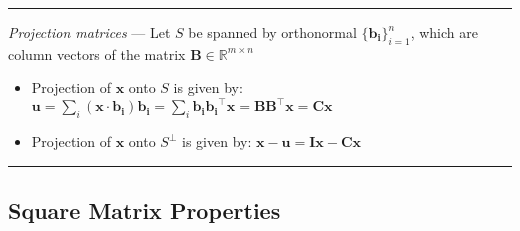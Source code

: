 {\color{lightgray}\hrule height 0.001mm}

\emph{Projection matrices} ---
Let $S$ be spanned by orthonormal $\{\boldsymbol{b_i}\}_{i=1}^n$, which are column vectors of the matrix $\boldsymbol{B} \in \mathbb{R}^{m \times n}$
\begin{itemize}
    \item Projection of $\boldsymbol{x}$ onto $S$ is given by: $\boldsymbol{u} = \sum_i (\boldsymbol{x} \cdot \boldsymbol{b_i}) \boldsymbol{b_i} = \sum_i \boldsymbol{b_i} \boldsymbol{b_i}^\intercal \boldsymbol{x} = \boldsymbol{B}\boldsymbol{B}^\intercal\boldsymbol{x} = \boldsymbol{C}\boldsymbol{x}$
    \item Projection of $\boldsymbol{x}$ onto $S^\bot$ is given by: $\boldsymbol{x} - \boldsymbol{u} = \boldsymbol{I}\boldsymbol{x} - \boldsymbol{C}\boldsymbol{x}$
\end{itemize}


{\color{black}\hrule height 0.001mm}

\subsection*{Square Matrix Properties}

